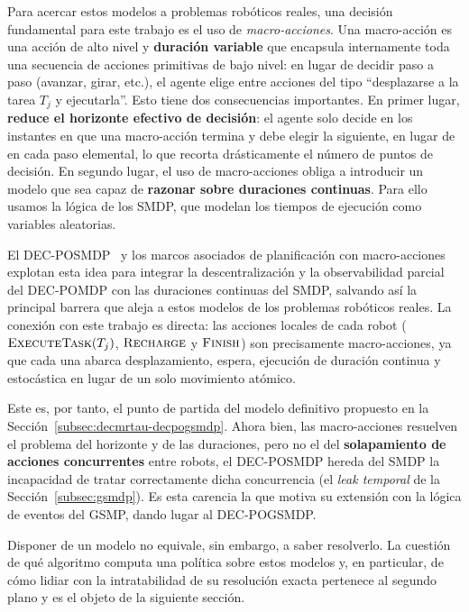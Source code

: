 Para acercar estos modelos a problemas robóticos reales, una decisión fundamental para este trabajo es el uso de \emph{macro-acciones}. Una macro-acción es una acción de alto nivel y \textbf{duración variable} que encapsula internamente toda una secuencia de acciones primitivas de bajo nivel: en lugar de decidir paso a paso (avanzar, girar, etc.), el agente elige entre acciones del tipo ``desplazarse a la tarea $T_j$ y ejecutarla''. Esto tiene dos consecuencias importantes. En primer lugar, \textbf{reduce el horizonte efectivo de decisión}: el agente solo decide en los instantes en que una macro-acción termina y debe elegir la siguiente, en lugar de en cada paso elemental, lo que recorta drásticamente el número de puntos de decisión. En segundo lugar, el uso de macro-acciones obliga a introducir un modelo que sea capaz de \textbf{razonar sobre duraciones continuas}. Para ello usamos la lógica de los SMDP, que modelan los tiempos de ejecución como variables aleatorias.

El DEC-POSMDP~\cite{omidshafiei2017decentralized} y los marcos asociados de planificación con macro-acciones~\cite{amato2019modeling} explotan esta idea para integrar la descentralización y la observabilidad parcial del DEC-POMDP con las duraciones continuas del SMDP, salvando así la principal barrera que aleja a estos modelos de los problemas robóticos reales. La conexión con este trabajo es directa: las acciones locales de cada robot ($\textsc{ExecuteTask}(T_j)$, $\textsc{Recharge}$ y $\textsc{Finish}$) son precisamente macro-acciones, ya que cada una abarca desplazamiento, espera, ejecución de duración continua y estocástica en lugar de un solo movimiento atómico.

Este es, por tanto, el punto de partida del modelo definitivo propuesto en la Sección~\ref{subsec:decmrtau-decpogsmdp}. Ahora bien, las macro-acciones resuelven el problema del horizonte y de las duraciones, pero no el del \textbf{solapamiento de acciones concurrentes} entre robots, el DEC-POSMDP hereda del SMDP la incapacidad de tratar correctamente dicha concurrencia (el \emph{leak temporal} de la Sección~\ref{subsec:gsmdp}). Es esta carencia la que motiva su extensión con la lógica de eventos del GSMP, dando lugar al DEC-POGSMDP.
 
Disponer de un modelo no equivale, sin embargo, a saber resolverlo. La cuestión de qué algoritmo computa una política sobre estos modelos y, en particular, de cómo lidiar con la intratabilidad de su resolución exacta pertenece al segundo plano y es el objeto de la siguiente sección.

